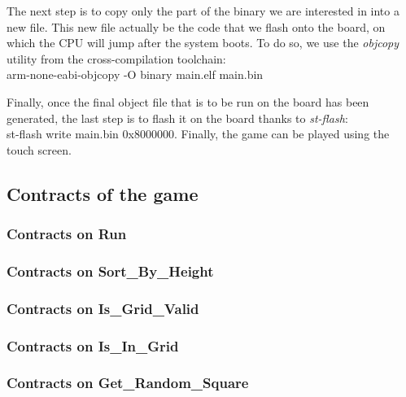 The next step is to copy only the part of the binary we are interested in into
a new file. This new file actually be the code that we flash onto the board,
on which the CPU will jump after the system boots. To do so, we use the
\textit{objcopy} utility from the cross-compilation toolchain:\\
arm-none-eabi-objcopy -O binary main.elf main.bin

Finally, once the final object file that is to be run on the board has been
generated, the last step is to flash it on the board thanks to \textit{st-flash}:\\
st-flash write main.bin 0x8000000. Finally, the game can be played using the
touch screen.
\newpage

\subsection{Contracts of the game}

\subsubsection{Contracts on Run}


\subsubsection{Contracts on Sort\_By\_Height}


\subsubsection{Contracts on Is\_Grid\_Valid}


\subsubsection{Contracts on Is\_In\_Grid}


\subsubsection{Contracts on Get\_Random\_Square}


